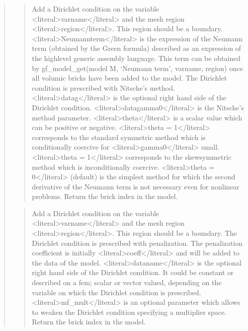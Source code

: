 \documentclass[a4paper,11pt,english]{sphinxmanual}
\begin{document}
\begin{quote}
\begin{quote}
\sphinxAtStartPar
Add a Dirichlet condition on the variable \textless{}literal\textgreater{}varname\textless{}/literal\textgreater{} and the mesh
region \textless{}literal\textgreater{}region\textless{}/literal\textgreater{}. This region should be a boundary. \textless{}literal\textgreater{}Neumannterm\textless{}/literal\textgreater{}
is the expression of the Neumann term (obtained by the Green formula)
described as an expression of the high\sphinxhyphen{}level
generic assembly language. This term can be obtained by
gf\_model\_get(model M, ‘Neumann term’, varname, region) once all volumic bricks have
been added to the model. The Dirichlet
condition is prescribed with Nitsche’s method. \textless{}literal\textgreater{}datag\textless{}/literal\textgreater{} is the optional
right hand side of the Dirichlet condition. \textless{}literal\textgreater{}datagamma0\textless{}/literal\textgreater{} is the
Nitsche’s method parameter. \textless{}literal\textgreater{}theta\textless{}/literal\textgreater{} is a scalar value which can be
positive or negative. \textless{}literal\textgreater{}theta = 1\textless{}/literal\textgreater{} corresponds to the standard symmetric
method which is conditionally coercive for  \textless{}literal\textgreater{}gamma0\textless{}/literal\textgreater{} small.
\textless{}literal\textgreater{}theta = \sphinxhyphen{}1\textless{}/literal\textgreater{} corresponds to the skew\sphinxhyphen{}symmetric method which is
inconditionally coercive. \textless{}literal\textgreater{}theta = 0\textless{}/literal\textgreater{} (default) is the simplest method
for which the second derivative of the Neumann term is not necessary
even for nonlinear problems. Return the brick index in the model.
\end{quote}

\sphinxAtStartPar
{}
\begin{quote}

\sphinxAtStartPar
Add a Dirichlet condition on the variable \textless{}literal\textgreater{}varname\textless{}/literal\textgreater{} and the mesh
region \textless{}literal\textgreater{}region\textless{}/literal\textgreater{}. This region should be a boundary. The Dirichlet
condition is prescribed with penalization. The penalization coefficient
is initially \textless{}literal\textgreater{}coeff\textless{}/literal\textgreater{} and will be added to the data of the model.
\textless{}literal\textgreater{}dataname\textless{}/literal\textgreater{} is the optional right hand side of the Dirichlet condition.
It could be constant or described on a fem; scalar or vector valued,
depending on the variable on which the Dirichlet condition is prescribed.
\textless{}literal\textgreater{}mf\_mult\textless{}/literal\textgreater{} is an optional parameter which allows to weaken the
Dirichlet condition specifying a multiplier space.
Return the brick index in the model.
\end{quote}


\end{quote}
\end{document}
